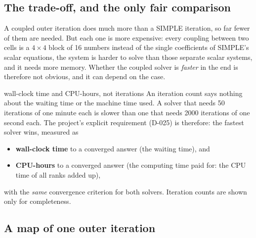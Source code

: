 \documentclass[11pt,a4paper]{article}
\begin{document}
\subsection{The trade-off, and the only fair comparison}\label{sec:fair}

A coupled outer iteration does much more than a SIMPLE iteration, so far
fewer of them are needed. But each one is more expensive: every coupling
between two cells is a $4\times4$ block of 16 numbers instead of the single
coefficients of SIMPLE's scalar equations, the system is harder to solve
than those separate scalar systems, and it needs more memory. Whether the coupled
solver is \emph{faster} in the end is therefore not obvious, and it can
depend on the case.

\begin{whyitmatters}{wall-clock time and CPU-hours, not iterations}
  An iteration count says nothing about the waiting time or the machine
  time used. A solver that needs 50 iterations of one minute each is
  slower than one that needs 2000 iterations of one second each. The
  project's explicit requirement (D-025) is therefore: the fastest solver
  wins, measured as
  \begin{itemize}
  \item \textbf{wall-clock time} to a converged answer (the waiting time),
    and
  \item \textbf{CPU-hours} to a converged answer (the computing time paid
    for: the CPU time of all ranks added up),
  \end{itemize}
  with the \emph{same} convergence criterion for both solvers. Iteration
  counts are shown only for completeness.
\end{whyitmatters}

\subsection{A map of one outer iteration}\label{sec:map}
\end{document}
